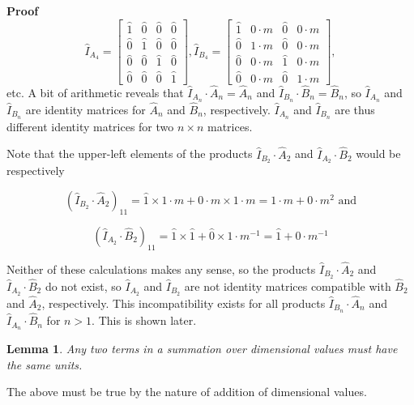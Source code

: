 \documentclass[10pt,letterpaper]{article}
\newtheorem{lem}{Lemma}[section]
\newenvironment{proof}{\noindent\textbf{Proof} }{\qed \newline}
\newcommand{\qed}{\nobreak \ifvmode \relax \else
      \ifdim\lastskip<1.5em \hskip-\lastskip
      \hskip1.5em plus0em minus0.5em \fi \nobreak
      \vrule height0.75em width0.5em depth0.25em\fi}
\numberwithin{equation}{section}
\begin{document}
\begin{proof}
 \[ \hat I_{A_4} = \left[ \begin{matrix} 
  \hat 1 & \hat 0 & \hat 0 & \hat 0 \\
  \hat 0 & \hat 1 & \hat 0 & \hat 0 \\
  \hat 0 & \hat 0 & \hat 1 & \hat 0 \\
  \hat 0 & \hat 0 & \hat 0 & \hat 1
 \end{matrix} \right] ,
 \hat I_{B_4} = \left[ \begin{matrix} 
  \hat 1 & 0 \cdot m & \hat 0 & 0 \cdot m \\
  \hat 0 & 1 \cdot m & \hat 0 & 0 \cdot m \\
  \hat 0 & 0 \cdot m & \hat 1 & 0 \cdot m \\
  \hat 0 & 0 \cdot m & \hat 0 & 1 \cdot m
 \end{matrix} \right] , \] etc.  A bit of arithmetic reveals that
$\hat I_{A_n} \cdot \hat A_n = \hat A_n$ and $\hat I_{B_n} \cdot \hat
B_n = \hat B_n$, so $\hat I_{A_n}$ and $\hat I_{B_n}$ are identity
matrices for $\hat A_n$ and $\hat B_n$, respectively.  $\hat I_{A_n}$
and $\hat I_{B_n}$ are thus different identity matrices for two $n
\times n$ matrices.\end{proof}

Note that the upper-left elements of the products $\hat I_{B_2} \cdot
\hat A_2$ and $\hat I_{A_2} \cdot \hat B_2$ would be respectively

\[ (\hat I_{B_2} \cdot \hat A_2)_{11} = \hat 1 \times 1 \cdot m + 0
\cdot m \times 1 \cdot m = 1 \cdot m + 0 \cdot m^2 \mbox{ and} \]

\[(\hat I_{A_2} \cdot \hat B_2)_{11} = \hat 1 \times \hat 1 + \hat 0
\times 1 \cdot m^{-1} = \hat 1 + 0 \cdot m^{-1} \]

Neither of these calculations makes any sense, so the products $\hat
I_{B_2} \cdot \hat A_2$ and $\hat I_{A_2} \cdot \hat B_2$ do not
exist, so $\hat I_{A_2}$ and $\hat I_{B_2}$ are not identity matrices
compatible with $\hat B_2$ and $\hat A_2$, respectively.  This
incompatibility exists for all products $\hat I_{B_n} \cdot \hat A_n$
and $\hat I_{A_n} \cdot \hat B_n$ for $n > 1$.  This is shown later.

\begin{lem} \label{terms_of_a_summation_have_equal_units} Any two
  terms in a summation over dimensional values must have the same
  units.\end{lem}

The above must be true by the nature of addition of dimensional values.
\end{document}

